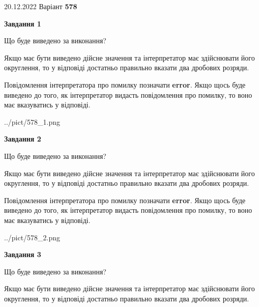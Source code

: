 \documentclass[12pt, ukrainian]{article}
\begin{document}
{20.12.2022 Варіант \No \textbf { 578 }\par}
{
\begin {Large}

{\begin {center}\textbf{Завдання 1}\end {center}}\par
Що буде виведено за виконання? \par

Якщо має бути виведено дійсне значення та інтерпретатор має здійснювати його округлення, 
то у відповіді достатньо правильно вказати два дробових розряди.

Повідомлення інтерпретатора про помилку позначати \textbf{error}.
Якщо щось буде виведено до того, як інтерпретатор видасть повідомлення про помилку, 
то воно має вказуватись у відповіді. \par

\begin{center}
	{../pict/578_1.png}
\end{center}
\newpage

{\begin {center}\textbf{Завдання 2}\end {center}}\par
Що буде виведено за виконання? \par

Якщо має бути виведено дійсне значення та інтерпретатор має здійснювати його округлення, 
то у відповіді достатньо правильно вказати два дробових розряди.

Повідомлення інтерпретатора про помилку позначати \textbf{error}.
Якщо щось буде виведено до того, як інтерпретатор видасть повідомлення про помилку, 
то воно має вказуватись у відповіді. \par

\begin{center}
	{../pict/578_2.png}
\end{center}
\newpage

{\begin {center}\textbf{Завдання 3}\end {center}}\par
Що буде виведено за виконання? \par

Якщо має бути виведено дійсне значення та інтерпретатор має здійснювати його округлення, 
то у відповіді достатньо правильно вказати два дробових розряди.


\end{Large}}
\end{document}
